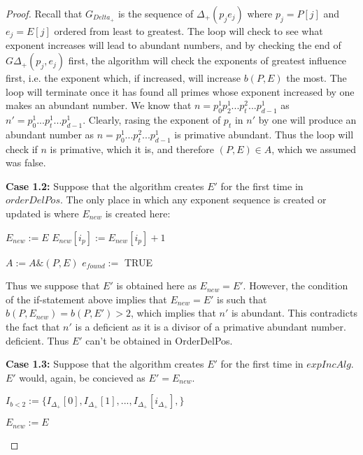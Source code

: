 \documentclass[../paper.tex]{subfiles}
\begin{document}
\begin{proof}
  Recall that $G_{Delta_+}$ is the sequence of $\Delta_+(p_j e_j)$
where $p_j = P[j]$ and $e_j = E[j]$ ordered from least to greatest.
The loop will check to see what exponent increases will lead to
abundant numbers, and by checking the end of $G\Delta_+(p_j, e_j)$
first, the algorithm will check the exponents of greatest
influence first, i.e. the exponent which, if increased, will
increase $b(P,E)$ the most. The loop will terminate once it
has found all primes whose exponent increased by one makes an
abundant number. We know that $n = p_0^1 p_2^1 ... p_t^2...
p_{d-1}^1$ as $n' = p_0^1 ... p_t^1 ... p_{d-1}^1$.
 Clearly, rasing the exponent of $p_t$ in $n'$ by one will
produce an abundant number as $n = p_0^{1} ... p_t^{2} ...
p_{d-1}^1$ is primative abundant. Thus the loop will check if $n$
is primative, which it is, and therefore $(P,E) \in A$, which we
assumed was false.

\textbf{Case 1.2:}
  Suppose that the algorithm creates $E'$ for the first time in
$orderDelPos$. The only place in which any exponent sequence is created
or updated is where $E_{new}$ is created here:
\begin{algorithmic}
 
		\STATE $E_{new} := E$
		\STATE $E_{new}[ i_p ] := E_{new}[ i_p ] + 1 $
		
			\STATE $A := A\&(P,E)$
			\STATE $e_{found} := $ TRUE
		\ENDIF 

  \ENDIF
\end{algorithmic}

  Thus we suppose that $E'$ is obtained here as $E_{new} = E'$.
However, the condition of the if-statement above implies that
$E_{new} = E'$ is such that $b(P,E_{new}) = b(P,E') > 2$, which
implies that $n'$ is abundant. This contradicts the fact that $n'$
is a deficient as it is a divisor of a primative abundant number.
deficient. Thus $E'$ can't be obtained in OrderDelPos.

\textbf{Case 1.3:}
  Suppose that the algorithm creates $E'$ for the first time in
$expIncAlg$. $E'$ would, again, be concieved as $E' = E_{new}$. 

\begin{algorithmic}
  \STATE $I_{b < 2} := \{I_{\Delta_{+}}[0], I_{\Delta_{+}}[1], 
	                       ..., I_{\Delta_{+}}[i_{\Delta_{+}}],\}$


  	\STATE $E_{new} := E$
		

\end{algorithmic}
\end{proof}
\end{document}
